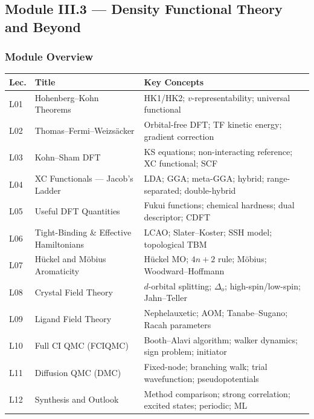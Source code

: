 \documentclass[11pt,a4paper]{article}
\begin{document}
\subsection{Module III.3 --- Density Functional Theory and Beyond}
\label{sec:mod-III3}

\subsubsection*{Module Overview}

{\footnotesize
\begin{center}
\begin{tabular}{@{}lp{4.2cm}p{6.8cm}@{}}
\toprule
\textbf{Lec.} & \textbf{Title} & \textbf{Key Concepts}\\
\midrule
L01 & Hohenberg--Kohn Theorems & HK1/HK2; $v$-representability; universal functional\\
L02 & Thomas--Fermi--Weizs\"acker & Orbital-free DFT; TF kinetic energy; gradient correction\\
L03 & Kohn--Sham DFT & KS equations; non-interacting reference; XC functional; SCF\\
L04 & XC Functionals --- Jacob's Ladder & LDA; GGA; meta-GGA; hybrid; range-separated; double-hybrid\\
L05 & Useful DFT Quantities & Fukui functions; chemical hardness; dual descriptor; CDFT\\
L06 & Tight-Binding \& Effective Hamiltonians & LCAO; Slater--Koster; SSH model; topological TBM\\
\midrule
L07 & H\"uckel and M\"obius Aromaticity & H\"uckel MO; $4n+2$ rule; M\"obius; Woodward--Hoffmann\\
L08 & Crystal Field Theory & $d$-orbital splitting; $\Delta_o$; high-spin/low-spin; Jahn--Teller\\
L09 & Ligand Field Theory & Nephelauxetic; AOM; Tanabe--Sugano; Racah parameters\\
L10 & Full CI QMC (FCIQMC) & Booth--Alavi algorithm; walker dynamics; sign problem; initiator\\
L11 & Diffusion QMC (DMC) & Fixed-node; branching walk; trial wavefunction; pseudopotentials\\
L12 & Synthesis and Outlook & Method comparison; strong correlation; excited states; periodic; ML\\
\bottomrule
\end{tabular}
\end{center}
}
\end{document}
